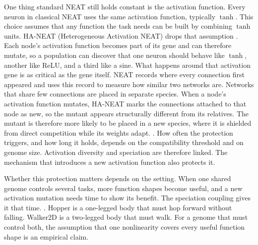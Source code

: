 One thing standard NEAT still holds constant is the activation function.
Every neuron in classical NEAT uses the same activation function, typically $\tanh$.
This choice assumes that any function the task needs can be built by combining $\tanh$ units.
HA-NEAT (Heterogeneous Activation NEAT) drops that assumption \parencite{hagg_evolving_2017}.
Each node's activation function becomes part of its gene and can therefore mutate, so a population can discover that one neuron should behave like $\tanh$, another like ReLU, and a third like a sine.
What happens around that activation gene is as critical as the gene itself.
NEAT records where every connection first appeared and uses this record to measure how similar two networks are. Networks that share few connections are placed in separate species.
When a node's activation function mutates, HA-NEAT marks the connections attached to that node as new, so the mutant appears structurally different from its relatives.
The mutant is therefore more likely to be placed in a new species, where it is shielded from direct competition while its weights adapt.  \parencite{hagg_evolving_2017}. How often the protection triggers, and how long it holds, depends on the compatibility threshold and on genome size.
Activation diversity and speciation are therefore linked. The mechanism that introduces a new activation function also protects it.

Whether this protection matters depends on the setting.
When one shared genome controls several tasks, more function shapes become useful, and a new activation mutation needs time to show its benefit.
The speciation coupling gives it that time.
 \parencite{freeman_brax_2021}.
Hopper is a one-legged body that must hop forward without falling. Walker2D is a two-legged body that must walk.
For a genome that must control both, the assumption that one nonlinearity covers every useful function shape is an empirical claim.



